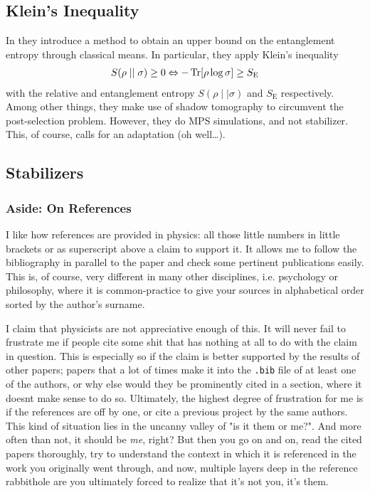 \subsection{Klein's Inequality}
In \cite{garrattProbingPostmeasurementEntanglement2023} they introduce a method
to obtain an upper bound on the entanglement entropy through classical means.
In particular, they apply Klein's inequality
\cite{nielsenQuantumComputationQuantum2010}
\begin{align}
  \label{eq:kleins-ineq}
  S(\rho \mid\mid \sigma) \geq 0 \Leftrightarrow -\Tr[\rho\log\sigma]\geq
  S_\mathrm{E}
\end{align}
with the relative and entanglement entropy $S(\rho\mid\mid\sigma)$ and
$S_\mathrm{E}$ respectively.
Among other things, they make use of shadow tomography to circumvent the
post-selection problem. 
However, they do MPS simulations, and not stabilizer. This, of course, calls
for an adaptation (oh well\ldots).
\subsection{Stabilizers}

\subsubsection{Aside: On References}
I like how references are provided in physics: all those little numbers in
little brackets or as superscript above a claim to support it. It allows me to
follow the bibliography in parallel to the paper and check some pertinent
publications easily. This is, of course, very different in many other
disciplines, i.e. psychology or philosophy, where it is common-practice to give
your sources in alphabetical order sorted by the author's surname.

I claim that physicists are not appreciative enough of this. It will never fail
to frustrate me if people cite some shit that has nothing at all to do with the
claim in question. This is especially so if the claim is better supported by
the results of other papers; papers that a lot of times make it into the
\texttt{.bib} file of at least one of the authors, or why else would they be
prominently cited in a section, where it doesnt make sense to do so.
Ultimately, the highest degree of frustration for me is if the references are
off by one, or cite a previous project by the same authors. This kind of
situation lies in the uncanny valley of "is it them or me?". And more often
than not, it should be \emph{me}, right? But then you go on and on, read the
cited papers thoroughly, try to understand the context in which it is
referenced in the work you originally went through, and now, multiple layers
deep in the reference rabbithole are you ultimately forced to realize that it's
not you, it's them. 

